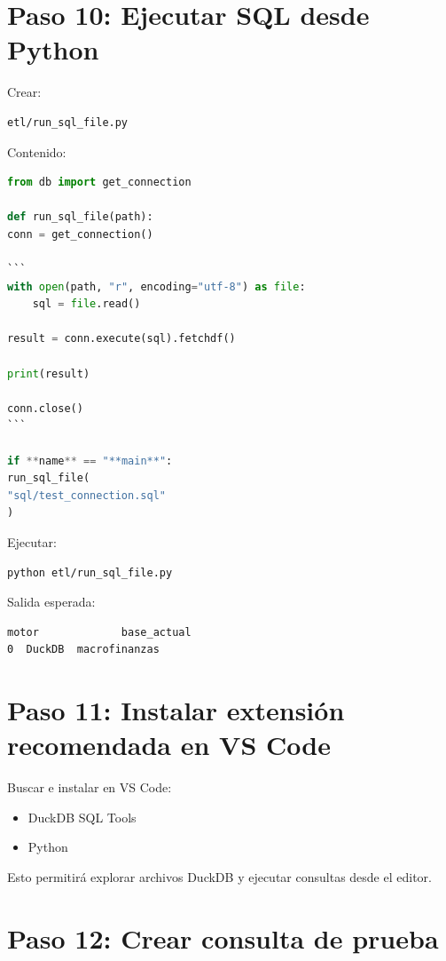 \section{Paso 10: Ejecutar SQL desde Python}

Crear:

\begin{verbatim}
etl/run_sql_file.py
\end{verbatim}

Contenido:

\begin{lstlisting}[language=Python]
from db import get_connection

def run_sql_file(path):
conn = get_connection()

```
with open(path, "r", encoding="utf-8") as file:
    sql = file.read()

result = conn.execute(sql).fetchdf()

print(result)

conn.close()
```

if **name** == "**main**":
run_sql_file(
"sql/test_connection.sql"
)
\end{lstlisting}

Ejecutar:

\begin{lstlisting}[language=bash]
python etl/run_sql_file.py
\end{lstlisting}

Salida esperada:

\begin{verbatim}
motor             base_actual
0  DuckDB  macrofinanzas
\end{verbatim}

\section{Paso 11: Instalar extensión recomendada en VS Code}

Buscar e instalar en VS Code:

\begin{itemize}
\item DuckDB SQL Tools
\item Python
\end{itemize}

Esto permitirá explorar archivos DuckDB y ejecutar consultas desde el editor.

\section{Paso 12: Crear consulta de prueba}

